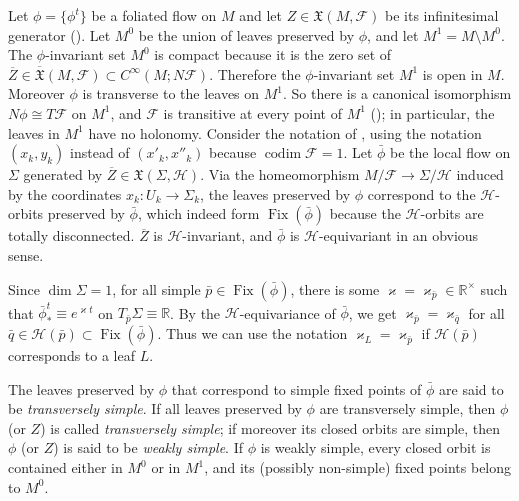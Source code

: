 \documentclass{memo-l}
\theoremstyle{plain}
\theoremstyle{definition}
\theoremstyle{remark}
\newcommand{\R}{\mathbb{R}}
\newcommand{\FF}{\mathcal{F}}
\newcommand{\HH}{\mathcal{H}}
\newcommand{\fX}{\mathfrak{X}}
\newcommand{\codim}{\operatorname{codim}}
\newcommand{\Fix}{\operatorname{Fix}}
\newcommand{\olfX}{\overline{\fX}}
\numberwithin{section}{chapter}
\numberwithin{equation}{section}%
\begin{document}
Let $\phi=\{\phi^t\}$ be a foliated flow on $M$ and let $Z\in\fX(M,\FF)$ be its infinitesimal generator (). Let $M^0$ be the union of leaves preserved by $\phi$, and let $M^1=M\setminus M^0$. The $\phi$-invariant set $M^0$ is compact because it is the zero set of $\overline{Z}\in\olfX(M,\FF)\subset C^\infty(M;N\FF)$. Therefore the $\phi$-invariant set $M^1$ is open in $M$. Moreover $\phi$ is transverse to the leaves on $M^1$. So there is a canonical isomorphism $N\phi\cong T\FF$ on $M^1$, and $\FF$ is transitive at every point of $M^1$ (); in particular, the leaves in $M^1$ have no holonomy. Consider the notation of , using the notation $(x_k,y_k)$ instead of $(x'_k,x''_k)$ because $\codim\FF=1$. Let $\bar\phi$ be the local flow on $\Sigma$ generated by $\overline Z\in\fX(\Sigma,\HH)$. Via the homeomorphism $M/\FF\to\Sigma/\HH$ induced by the coordinates $x_k:U_k\to\Sigma_k$, the leaves preserved by $\phi$ correspond to the $\HH$-orbits preserved by $\bar\phi$, which indeed form $\Fix(\bar\phi)$ because the $\HH$-orbits are totally disconnected. $\overline Z$ is $\HH$-invariant, and $\bar\phi$ is $\HH$-equivariant in an obvious sense.

Since $\dim\Sigma=1$, for all simple $\bar p\in\Fix(\bar\phi)$, there is some $\varkappa=\varkappa_{\bar p}\in\R^\times$ such that $\bar\phi^t_*\equiv e^{\varkappa t}$ on $T_{\bar p}\Sigma\equiv\R$. By the $\HH$-equivariance of $\bar\phi$, we get $\varkappa_{\bar p}=\varkappa_{\bar q}$ for all $\bar q\in\HH(\bar p)\subset\Fix(\bar\phi)$. Thus we can use the notation $\varkappa_L=\varkappa_{\bar p}$ if $\HH(\bar p)$ corresponds to a leaf $L$.

The leaves preserved by $\phi$ that correspond to simple fixed points of $\bar\phi$ are said to be \emph{transversely simple}. If all leaves preserved by $\phi$ are transversely simple, then $\phi$ {\rm(}or $Z${\rm)} is called \emph{transversely simple}; if moreover its closed orbits are simple, then $\phi$ {\rm(}or $Z${\rm)} is said to be \emph{weakly simple}. If $\phi$ is weakly simple, every closed orbit is contained either in $M^0$ or in $M^1$, and its (possibly non-simple) fixed points belong to $M^0$.
\end{document}
